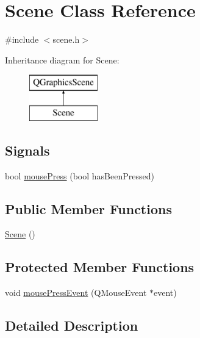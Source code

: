 \hypertarget{class_scene}{}\section{Scene Class Reference}
\label{class_scene}


{\ttfamily \#include $<$scene.\+h$>$}

Inheritance diagram for Scene\+:\begin{figure}[H]
\begin{center}
\leavevmode
\includegraphics[height=2.000000cm]{class_scene}
\end{center}
\end{figure}
\subsection*{Signals}
\begin{DoxyCompactItemize}
\item 
bool \mbox{\hyperlink{class_scene_a393b0ed4e907779249e2857d3b93a5f1}{mouse\+Press}} (bool has\+Been\+Pressed)
\end{DoxyCompactItemize}
\subsection*{Public Member Functions}
\begin{DoxyCompactItemize}
\item 
\mbox{\hyperlink{class_scene_ad10176d75a9cc0da56626f682d083507}{Scene}} ()
\end{DoxyCompactItemize}
\subsection*{Protected Member Functions}
\begin{DoxyCompactItemize}
\item 
void \mbox{\hyperlink{class_scene_af86554e49d701f3fe9f0ac4f568f7113}{mouse\+Press\+Event}} (Q\+Mouse\+Event $\ast$event)
\end{DoxyCompactItemize}


\subsection{Detailed Description}


